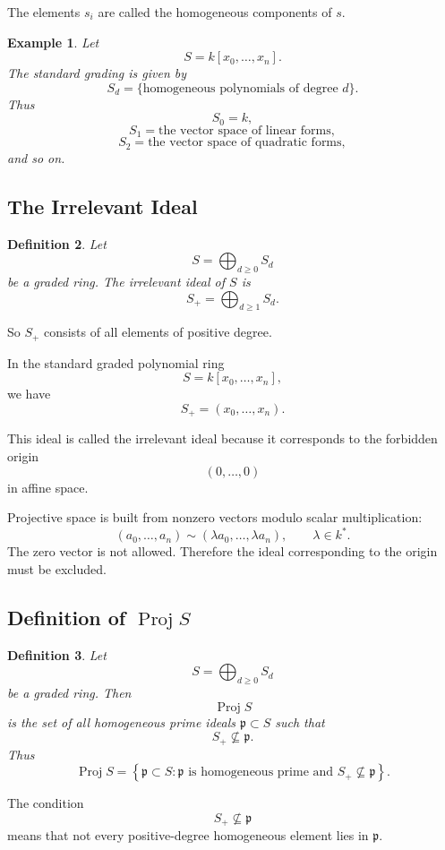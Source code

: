\documentclass[12pt,a4paper]{article}
\DeclareMathOperator{\Proj}{Proj}
\theoremstyle{notespace}
\newtheorem{definition}{Definition}[subsection]
\newtheorem{example}[definition]{Example}
\begin{document}
The elements \(s_i\) are called the homogeneous components of \(s\).

\begin{example}
	Let
	\[
	S=k[x_0,\dots,x_n].
	\]
	The standard grading is given by
	\[
	S_d=\{\text{homogeneous polynomials of degree }d\}.
	\]
	Thus
	\[
	S_0=k,
	\]
	\[
	S_1=\text{the vector space of linear forms},
	\]
	\[
	S_2=\text{the vector space of quadratic forms},
	\]
	and so on.
\end{example}

\subsection{The Irrelevant Ideal}

\begin{definition}
	Let
	\[
	S=\bigoplus_{d\ge 0}S_d
	\]
	be a graded ring. The \emph{irrelevant ideal} of \(S\) is
	\[
	S_+
	=
	\bigoplus_{d\ge 1}S_d.
	\]
\end{definition}

So \(S_+\) consists of all elements of positive degree.

In the standard graded polynomial ring
\[
S=k[x_0,\dots,x_n],
\]
we have
\[
S_+=(x_0,\dots,x_n).
\]

This ideal is called the irrelevant ideal because it corresponds to the forbidden origin
\[
(0,\dots,0)
\]
in affine space.

Projective space is built from nonzero vectors modulo scalar multiplication:
\[
(a_0,\dots,a_n)\sim(\lambda a_0,\dots,\lambda a_n),
\qquad \lambda\in k^*.
\]
The zero vector is not allowed. Therefore the ideal corresponding to the origin must be
excluded.

\subsection{Definition of \texorpdfstring{$\Proj S$}{Proj S}}

\begin{definition}
	Let
	\[
	S=\bigoplus_{d\ge 0}S_d
	\]
	be a graded ring. Then
	\[
	\Proj S
	\]
	is the set of all homogeneous prime ideals \(\mathfrak p\subset S\) such that
	\[
	S_+\not\subseteq \mathfrak p.
	\]
	Thus
	\[
	\Proj S
	=
	\left\{
	\mathfrak p\subset S:
	\mathfrak p \text{ is homogeneous prime and } S_+\not\subseteq \mathfrak p
	\right\}.
	\]
\end{definition}

The condition
\[
S_+\not\subseteq \mathfrak p
\]
means that not every positive-degree homogeneous element lies in \(\mathfrak p\).
\end{document}
